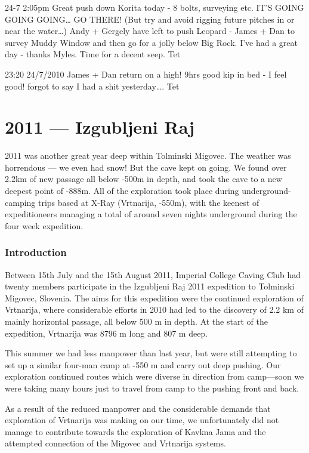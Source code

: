 24-7 2:05pm Great push down Korita today - 8 bolts, surveying etc. IT'S
GOING GOING GOING\ldots{} GO THERE! (But try and avoid rigging future
pitches in or near the water\ldots{}) Andy + Gergely have left to push
Leopard - James + Dan to survey Muddy Window and then go for a jolly
below Big Rock. I've had a great day - thanks Myles. Time for a decent
seep. Tet

23:20 24/7/2010 James + Dan return on a high! 9hrs good kip in bed - I
feel good! forgot to say I had a shit yesterday\ldots{}. Tet

\chapter{2011 --- Izgubljeni Raj}\label{izgubljeni-raj}

2011 was another great year deep within Tolminski Migovec. The weather
was horrendous --- we even had snow! But the cave kept on going. We
found over 2.2km of new passage all below -500m in depth, and took the
cave to a new deepest point of -888m. All of the exploration took place
during underground-camping trips based at X-Ray (Vrtnarija, -550m), with
the keenest of expeditioneers managing a total of around seven nights
underground during the four week expedition.

\subsection{Introduction}\label{introduction-2}

Between 15th July and the 15th August 2011, Imperial College Caving Club
had twenty members participate in the Izgubljeni Raj 2011 expedition to
Tolminski Migovec, Slovenia. The aims for this expedition were the
continued exploration of Vrtnarija, where considerable efforts in 2010
had led to the discovery of 2.2 km of mainly horizontal passage, all
below 500 m in depth. At the start of the expedition, Vrtnarija was 8796
m long and 807 m deep.

This summer we had less manpower than last year, but were still
attempting to set up a similar four-man camp at -550 m and carry out
deep pushing. Our exploration continued routes which were diverse in
direction from camp---soon we were taking many hours just to travel from
camp to the pushing front and back.

As a result of the reduced manpower and the considerable demands that
exploration of Vrtnarija was making on our time, we unfortunately did
not manage to contribute towards the exploration of Kavkna Jama and the
attempted connection of the Migovec and Vrtnarija systems.

